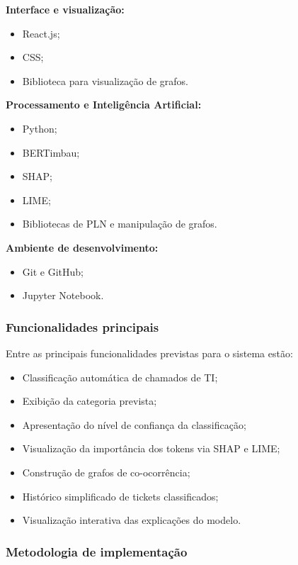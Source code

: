 \documentclass[
    12pt,                %
    openright,           %
    oneside,             %
    a4paper,             %
    english,             %
    brazil               %
]{abntex2}
\begin{document}
\textbf{Interface e visualização:}

\begin{itemize}
    \item React.js; 
    \item CSS;
    \item Biblioteca para visualização de grafos.
\end{itemize}

\textbf{Processamento e Inteligência Artificial:}

\begin{itemize}
    \item Python;
    \item BERTimbau;
    \item SHAP;
    \item LIME;
    \item Bibliotecas de PLN e manipulação de grafos.
\end{itemize}

\textbf{Ambiente de desenvolvimento:}

\begin{itemize}
    \item Git e GitHub;
    \item Jupyter Notebook.
\end{itemize}

\subsubsection{Funcionalidades principais}

Entre as principais funcionalidades previstas para o sistema estão:

\begin{itemize}
    \item Classificação automática de chamados de TI;
    \item Exibição da categoria prevista;
    \item Apresentação do nível de confiança da classificação;
    \item Visualização da importância dos tokens via SHAP e LIME;
    \item Construção de grafos de co-ocorrência;
    \item Histórico simplificado de tickets classificados;
    \item Visualização interativa das explicações do modelo.
\end{itemize}

\subsubsection{Metodologia de implementação}
\end{document}

